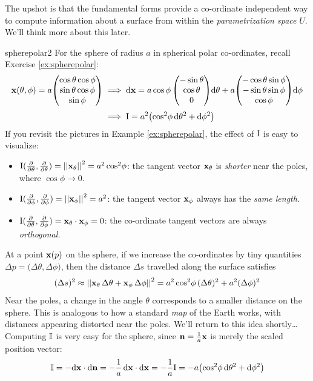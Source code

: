 The upshot is that the fundamental forms provide a co-ordinate independent way to compute information about a surface from within the \emph{parametrization space} $U$. We'll think more about this later.


\begin{example}{}{spherepolar2}
For the sphere of radius $a$ in spherical polar co-ordinates, recall Exercise \ref{ex:spherepolar}:
\begin{align*}
{\mathbf{x}}(\theta,\phi)=a\!\begin{pmatrix}\cos\theta\cos\phi\\\sin\theta\cos\phi\\\sin\phi\end{pmatrix}&\implies\mathrm{d}{\mathbf{x}}=a\cos\phi\begin{pmatrix}-\sin\theta\\\cos\theta\\0\end{pmatrix}\!{\mathrm{d}\theta}+a\!\begin{pmatrix}-\cos\theta\sin\phi\\-\sin\theta\sin\phi\\\cos\phi\end{pmatrix}\!\mathrm{d}\phi\\[3pt]
&\implies \mathrm{I}=a^2\bigl(\cos^2\!\phi\,\mathrm{d}\theta^2+\mathrm{d}\phi^2\bigr)
\end{align*}
If you revisit the pictures in Example \ref{ex:spherepolar}, the effect of $\mathrm{I}$ is easy to visualize:
\begin{itemize}\itemsep2pt
  \item $\mathrm{I}(\frac{\partial }{\partial \theta},\frac{\partial }{\partial \theta})=\left| \left| {\mathbf{x}}_\theta\right|\right|^2=a^2\cos^2\!\phi$: the tangent vector ${\mathbf{x}}_\theta$ is \emph{shorter} near the poles, where $\cos\phi\to 0$.
  \item $\mathrm{I}(\frac{\partial }{\partial \phi},\frac{\partial }{\partial \phi})=\left| \left| {\mathbf{x}}_\phi\right|\right|^2=a^2$: the tangent vector ${\mathbf{x}}_\phi$ always has the \emph{same length.}
  \item $\mathrm{I}(\frac{\partial }{\partial \theta},\frac{\partial }{\partial \phi})={\mathbf{x}}_\theta\cdot{\mathbf{x}}_\phi=0$: the co-ordinate tangent vectors are always \emph{orthogonal.}
\end{itemize}
At a point ${\mathbf{x}}(p)$ on the sphere, if we increase the co-ordinates by tiny quantities $\Delta p=\bigl(\Delta\theta,\Delta\phi)$, then the distance $\Delta s$ travelled along the surface satisfies\footnotemark
\[(\Delta s)^2\approx \left| \left| {\mathbf{x}}_\theta\,\Delta\theta+{\mathbf{x}}_\phi\,\Delta\phi\right|\right|^2= a^2\cos^2\!\phi\,(\Delta\theta)^2+a^2(\Delta\phi)^2\]
Near the poles, a change in the angle $\theta$ corresponds to a smaller distance on the sphere. This is analogous to how a standard \emph{map} of the Earth works, with distances appearing distorted near the poles. We'll return to this idea shortly\ldots\smallbreak
Computing $\mathbb{I}$ is very easy for the sphere, since ${\mathbf{n}}=\frac 1a{\mathbf{x}}$ is merely the scaled position vector:
\[\mathbb{I}=-\mathrm{d}{\mathbf{x}}\cdot\mathrm{d}{\mathbf{n}}=-\frac{1}{a}\,\mathrm{d}{\mathbf{x}}\cdot\mathrm{d}{\mathbf{x}}=-\frac{1}{a}\mathrm{I} =-a\bigl(\cos^2\!\phi\,\mathrm{d}\theta^2+\mathrm{d}\phi^2\bigr)\]
\end{example}

